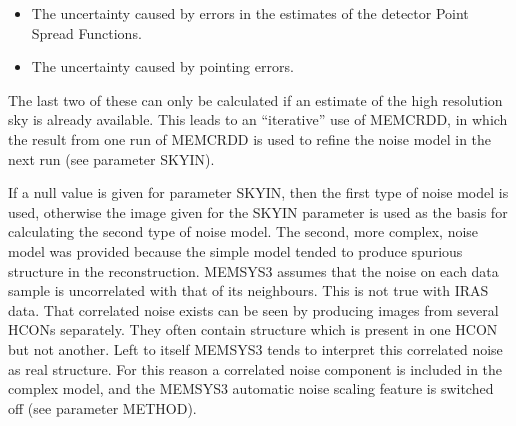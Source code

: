 \begin{enumerate}
\begin {itemize}
The correlated noise is estimated as follows:
\begin{itemize}

\item A low resolution image is formed from all the input scans using a simple
co-addition algorithm. Features which are not present in all scans will be
attenuated in this image due to the averaging process.

\item A set of low resolution images are formed in which each image contains
data from only one scan.

\item A set of images containing the squared residuals between each single-scan
image and the all-scan image are formed. These residuals will be high for
features which are present in the single-scan image but which are attenuated in
the all-scan image.

\item The OPUS routine is applied to each residual image to create something
which looks like a simulated data set, but in which each sample is actually
an estimate of the mean variance between the single-scan image and the
all-scan image over the area of the corresponding data sample.

\end{itemize}

\item The uncertainty caused by errors in the estimates of the detector Point
Spread Functions.
\item The uncertainty caused by pointing errors.
\end{itemize}
The last two of these can only be calculated if an estimate of the high
resolution sky is already available. This leads to an ``iterative'' use of
MEMCRDD, in which the result from one run of MEMCRDD is used to refine the noise
model in the next run (see parameter SKYIN).

\end{enumerate}

If a null value is given for parameter SKYIN, then the first type of noise
model is  used, otherwise the image given for the SKYIN parameter is used as
the basis for  calculating the second type of noise model. The second, more
complex, noise  model was provided because the simple model tended to produce
spurious structure  in the reconstruction. MEMSYS3 assumes that the noise on
each data sample is  uncorrelated with that of its neighbours. This is not true
with IRAS data.  That correlated noise exists can be seen by producing images
from several HCONs separately. They often contain structure which is present in
one HCON but not  another. Left to itself MEMSYS3 tends to interpret this
correlated noise as  real structure. For this reason a correlated noise
component is included in the  complex model, and the MEMSYS3 automatic noise
scaling feature is switched  off (see parameter METHOD).

